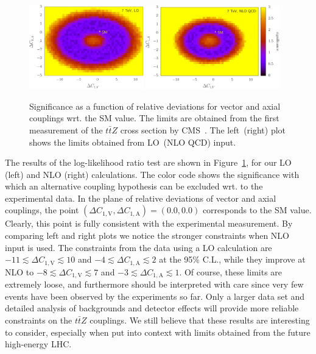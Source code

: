 \documentclass{JHEP3}
\def\ttbZ{t\bar{t}Z}
\def\DConeA{\Delta C_{1,\mathrm{A}}}
\def\DConeV{\Delta C_{1,\mathrm{V}}}
\begin{document}
\begin{figure}[t]
\centering 
\includegraphics[width=0.44\textwidth]{./CMS_LO.pdf}
\hspace{2mm}
\includegraphics[width=0.518\textwidth]{./CMS_NLO.pdf}
\caption{\label{fig:CMSbounds}
Significance as a function of relative deviations for vector and axial couplings wrt. the SM value. 
The limits are obtained from the first measurement of the $\ttbZ$ cross section by CMS~\cite{Chatrchyan:2013qca}. 
The left~(right) plot shows the limits obtained from LO~(NLO QCD) input.
}
\end{figure}
% 
The results of the log-likelihood ratio test are shown in Figure~\ref{fig:CMSbounds}, for our LO (left) and NLO (right) calculations.
The color code shows the significance with which an alternative coupling hypothesis can be excluded wrt. to the experimental data.
In the plane of relative deviations of vector and axial couplings, the point $(\DConeV,\DConeA)=(0.0,0.0)$ corresponds to the SM value.
Clearly, this point is fully consistent with the experimental measurement.
By comparing left and right plots we notice the stronger constraints when NLO input is used. 
The constraints from the data using a LO calculation are $ -11 \lesssim \DConeV \lesssim 10$ and $-4 \lesssim \DConeA \lesssim 2$ at the 95\% C.L.,
while they improve at NLO to $-8 \lesssim \DConeV \lesssim 7$ and $-3 \lesssim \DConeA \lesssim  1$.
Of course, these limits are extremely loose, and furthermore should be interpreted with care since very few events have been observed by the experiments so far.
Only a larger data set and detailed analysis of backgrounds and detector effects will provide more reliable constraints on the $\ttbZ$ couplings.
We still believe that these results are interesting to consider, especially when put into context with limits
obtained from the future high-energy LHC.
\end{document}
